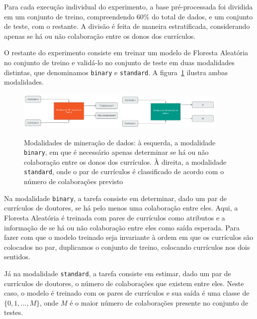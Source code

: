 \documentclass[12pt]{article}
\begin{document}
Para cada execução individual do experimento, a base pré-processada foi dividida em um conjunto de treino, compreendendo 60\% do total de dados, e um conjunto de teste, com o restante.
A divisão é feita de maneira estratificada, considerando apenas se há ou não colaboração entre os donos dos currículos.

O restante do experimento consiste em treinar um modelo de Floresta Aleatória no conjunto de treino e validá-lo no conjunto de teste em duas modalidades distintas, que denominamos \texttt{binary} e \texttt{standard}.
A figura~\ref{fig:modalities} ilustra ambas modalidades.

\begin{figure}
  \begin{center}
    \includegraphics[width=0.45\textwidth]{images/binary.png}
    \hspace{10pt}
    \includegraphics[width=0.45\textwidth]{images/standard.png}
  \end{center}
  \caption{Modalidades de mineração de dados: à esquerda, a modalidade \texttt{binary}, em que é necessário apenas determinar se há ou não colaboração entre os donos dos currículos. À direita, a modalidade \texttt{standard}, onde o par de currículos é classificado de acordo com o número de colaborações previsto}
  \label{fig:modalities}
\end{figure}

Na modalidade \texttt{binary}, a tarefa consiste em determinar, dado um par de currículos de doutores, se há pelo menos uma colaboração entre eles.
Aqui, a Floresta Aleatória é treinada com pares de currículos como atributos e a informação de se há ou não colaboração entre eles como saída esperada.
Para fazer com que o modelo treinado seja invariante à ordem em que os currículos são colocados no par, duplicamos o conjunto de treino, colocando currículos nos dois sentidos.

Já na modalidade \texttt{standard}, a tarefa consiste em estimar, dado um par de currículos de doutores, o número de colaborações que existem entre eles.
Neste caso, o modelo é treinado com os pares de currículos e sua saída é uma classe de $\{0, 1, ..., M\}$, onde $M$ é o maior número de colaborações presente no conjunto de testes.
\end{document}
